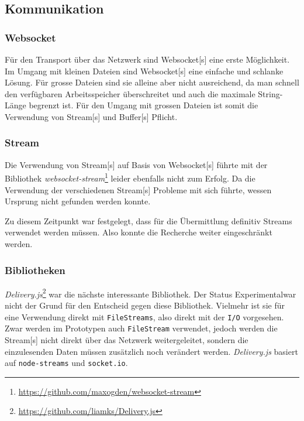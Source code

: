 \subsection{Kommunikation}

\subsubsection{Websocket}

Für den Transport über das Netzwerk sind \gls{Websocket}[s] eine erste Möglichkeit. Im Umgang mit kleinen Dateien sind \gls{Websocket}[s] eine einfache und schlanke Lösung. Für grosse Dateien sind sie alleine aber nicht ausreichend, da man schnell den verfügbaren Arbeitsspeicher überschreitet und auch die maximale String-Länge begrenzt ist. Für den Umgang mit grossen Dateien ist somit die Verwendung von \gls{Stream}[s] und \gls{Buffer}[s] Pflicht. 


\subsubsection{Stream}


Die Verwendung von \gls{Stream}[s] auf Basis von \gls{Websocket}[s] führ\-te mit der Bi\-blio\-thek \textit{websocket-stream}\footnote{\url{https://github.com/maxogden/websocket-stream}} leider ebenfalls nicht zum Erfolg. Da die Verwendung der verschiedenen \gls{Stream}[s] Probleme mit sich führte, wessen Ursprung nicht gefunden werden konnte.

Zu diesem Zeitpunkt war festgelegt, dass für die Übermittlung definitiv Streams verwendet werden müssen. Also konnte die Recherche weiter eingeschränkt werden.


\subsubsection{Bibliotheken}


\textit{Delivery.js}\footnote{\url{https://github.com/liamks/Delivery.js}} war die nächste interessante Bibliothek. Der Status \glqq Experimental\grqq war nicht der Grund für den Entscheid gegen diese Bibliothek. Vielmehr ist sie für eine Verwendung direkt mit \texttt{FileStreams}, also direkt mit der \texttt{I/O} vorgesehen. Zwar werden im Prototypen auch \texttt{FileStream} verwendet, jedoch werden die \gls{Stream}[s] nicht direkt über das Netzwerk weitergeleitet, sondern die einzulesenden Daten müssen zusätzlich noch verändert werden. \textit{Delivery.js} basiert auf \texttt{node-streams} und \texttt{socket.io}.


